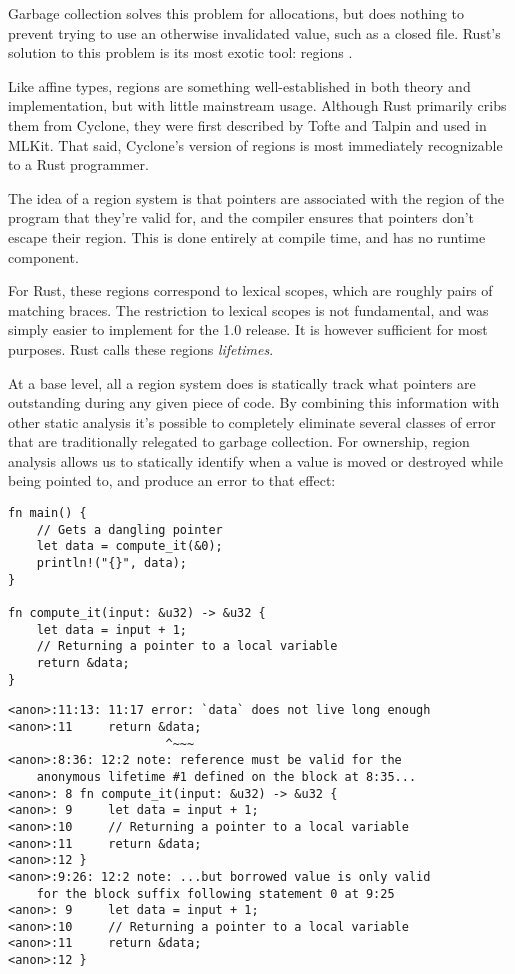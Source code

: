 Garbage collection solves this problem for allocations, but does nothing to
prevent trying to use an otherwise invalidated value, such as a closed file.
Rust's solution to this problem is its most exotic tool: regions \cite{swamy2006safe}.

Like affine types, regions are something well-established in both theory and
implementation, but with little mainstream usage. Although Rust primarily cribs
them from Cyclone, they were first described by Tofte and Talpin \cite{tofte1997region}
and used in MLKit. That said, Cyclone's version of regions
is most immediately recognizable to a Rust programmer.

The idea of a region system is that pointers are associated with the region of
the program that they're valid for, and the compiler ensures that pointers don't
escape their region. This is done entirely at compile time, and has no runtime
component.

For Rust, these regions correspond to lexical scopes, which are roughly
pairs of matching braces. The restriction to lexical scopes is not fundamental,
and was simply easier to implement for the 1.0 release. It is however sufficient
for most purposes. Rust calls these regions \emph{lifetimes}.

At a base level, all a region system does is statically track what pointers are
outstanding during any given piece of code. By combining this information with
other static analysis it's possible to completely eliminate several classes of error
that are traditionally relegated to garbage collection. For ownership, region analysis allows us
to statically identify when a value is moved or destroyed while being pointed to,
and produce an error to that effect:

\begin{verbatim}
fn main() {
    // Gets a dangling pointer
    let data = compute_it(&0);
    println!("{}", data);
}

fn compute_it(input: &u32) -> &u32 {
    let data = input + 1;
    // Returning a pointer to a local variable
    return &data;
}
\end{verbatim}

\begin{verbatim}
<anon>:11:13: 11:17 error: `data` does not live long enough
<anon>:11     return &data;
                      ^~~~
<anon>:8:36: 12:2 note: reference must be valid for the
    anonymous lifetime #1 defined on the block at 8:35...
<anon>: 8 fn compute_it(input: &u32) -> &u32 {
<anon>: 9     let data = input + 1;
<anon>:10     // Returning a pointer to a local variable
<anon>:11     return &data;
<anon>:12 }
<anon>:9:26: 12:2 note: ...but borrowed value is only valid
    for the block suffix following statement 0 at 9:25
<anon>: 9     let data = input + 1;
<anon>:10     // Returning a pointer to a local variable
<anon>:11     return &data;
<anon>:12 }
\end{verbatim}


